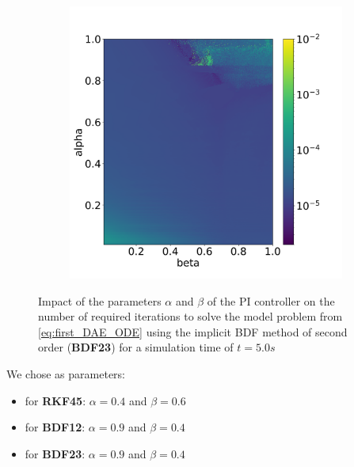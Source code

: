 \begin{figure}[H]
\begin{subfigure}{0.32\textwidth}
        \label{fig:numberIterationTSBDF23}
    \end{subfigure}
    \begin{subfigure}{0.32\textwidth}
    	\centering
    	\includegraphics[width=1\textwidth]{images/analysis_BDF23_psi.png}
        \label{fig:numberNumericalSchemeBDF23}
    \end{subfigure}
    \caption{Impact of the parameters $\alpha$ and $\beta$ of the PI controller on the number of required iterations to solve the model problem from \autoref{eq:first_DAE_ODE} using the implicit BDF method of second order (\textbf{BDF23}) for a simulation time of $t=5.0s$}
    \label{fig:ParametersPIControllerBDF23}
\end{figure}

We chose as parameters: 
\begin{itemize}
    \item for \textbf{RKF45}: $\alpha=0.4$ and $\beta=0.6$
    \item for \textbf{BDF12}: $\alpha=0.9$ and $\beta=0.4$
    \item for \textbf{BDF23}: $\alpha=0.9$ and $\beta=0.4$
\end{itemize}

